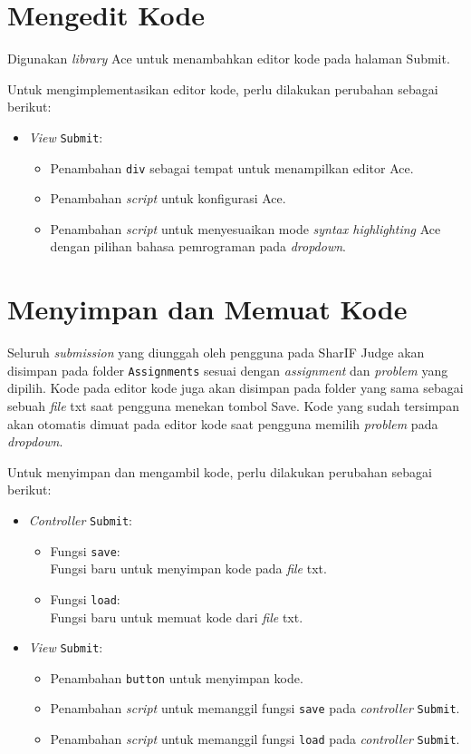 \section{Mengedit Kode}
\label{sec:4:editor}

Digunakan \textit{library} Ace untuk menambahkan editor kode pada halaman Submit.

Untuk mengimplementasikan editor kode, perlu dilakukan perubahan sebagai berikut:
\begin{itemize}
    \item \textit{View} \verb|Submit|:
    \begin{itemize}
        \item Penambahan \verb|div| sebagai tempat untuk menampilkan editor Ace.
        \item Penambahan \textit{script} untuk konfigurasi Ace.
        \item Penambahan \textit{script} untuk menyesuaikan mode \textit{syntax highlighting} Ace dengan pilihan bahasa pemrograman pada \textit{dropdown}.
    \end{itemize}
\end{itemize}

\section{Menyimpan dan Memuat Kode}
\label{sec:4:simpan}

Seluruh \textit{submission} yang diunggah oleh pengguna pada SharIF Judge akan disimpan pada folder \verb|Assignments| sesuai dengan \textit{assignment} dan \textit{problem} yang dipilih. Kode pada editor kode juga akan disimpan pada folder yang sama sebagai sebuah \textit{file} txt saat pengguna menekan tombol Save. Kode yang sudah tersimpan akan otomatis dimuat pada editor kode saat pengguna memilih \textit{problem} pada \textit{dropdown}.

Untuk menyimpan dan mengambil kode, perlu dilakukan perubahan sebagai berikut:
\begin{itemize}
	\item \textit{Controller} \verb|Submit|:
    \begin{itemize}
		\item Fungsi \verb|save|: \\ Fungsi baru untuk menyimpan kode pada \textit{file} txt.
		\item Fungsi \verb|load|: \\ Fungsi baru untuk memuat kode dari \textit{file} txt.
    \end{itemize}
    \item \textit{View} \verb|Submit|:
    \begin{itemize}
        \item Penambahan \verb|button| untuk menyimpan kode.
        \item Penambahan \textit{script} untuk memanggil fungsi \verb|save| pada \textit{controller} \verb|Submit|. 
        \item Penambahan \textit{script} untuk memanggil fungsi \verb|load| pada \textit{controller} \verb|Submit|. 
    \end{itemize}
\end{itemize}

